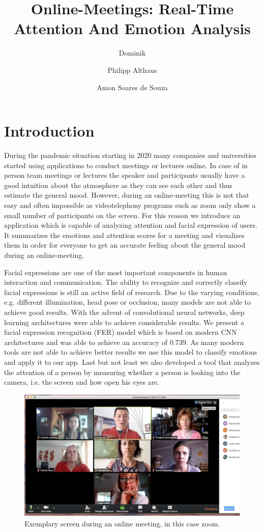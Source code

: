 \documentclass{article}
\title{Online-Meetings: Real-Time Attention And Emotion Analysis}
\author{
Dominik\and Philipp Althaus
 \and
Amon Soares de Souza
}
\begin{document}

\maketitle

\section{Introduction}
During the pandemic situation starting in 2020 many companies and universities started using applications to conduct meetings or lectures online. In case of in person team meetings or lectures the speaker and participants usually have a good intuition about the atmosphere as they can see each other and thus estimate the general mood. However, during an online-meeting this is not that easy and often impossible as videotelephony programs such as zoom only show a small number of participants on the screen. For this reason we introduce an application which is capable of analyzing attention and facial expression of users. It summarizes the emotions and attention scores for a meeting and visualizes them in order for everyone to get an accurate feeling about the general mood during an online-meeting.

Facial expressions are one of the most important components in human interaction and communication. The ability to recognize and correctly classify facial expressions is still an active field of research. Due to the varying conditions, e.g. different illumination, head pose or occlusion, many models are not able to achieve good results. With the advent of convolutional neural networks, deep learning architectures were able to achieve considerable results. We present a facial expression recognition (FER) model which is based on modern CNN architectures and was able to achieve an accuracy of $0.739$. As many modern tools are not able to achieve better results we use this model to classify emotions and apply it to our app. Last but not least we also developed a tool that analyzes the attention of a person by measuring whether a person is looking into the camera, i.e. the screen and how open his eyes are.

\begin{figure}
  \centering
  \includegraphics[width=.3\textwidth]{"zoom"}
  \caption{Exemplary screen during an online meeting, in this case zoom.}
  \label{fig:zoom}
\end{figure}
\end{document}
